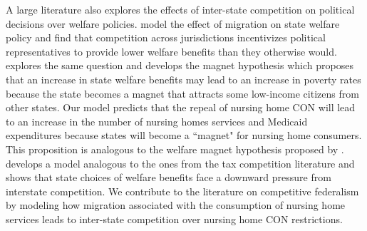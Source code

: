 \documentclass[../Main.tex]{subfiles}
\begin{document}
A large literature also explores the effects of inter-state competition on political decisions over welfare policies. \citet{gramlich1984migration} model the effect of migration on state welfare policy and find that competition across jurisdictions incentivizes political representatives to provide lower welfare benefits than they otherwise would. \citet{peterson1989american} explores the same question and develops the magnet hypothesis which proposes that an increase in state welfare benefits may lead to an increase in poverty rates because the state becomes a magnet that attracts some low-income citizens from other states. Our model predicts that the repeal of nursing home CON will lead to an increase in the number of nursing homes services and Medicaid expenditures because states will become a ``magnet" for nursing home consumers. This proposition is analogous to the welfare magnet hypothesis proposed by \citet{peterson1989american}. \citet{saavedra2000model} develops a model analogous to the ones from the tax competition literature and shows that state choices of welfare benefits face a downward pressure from interstate competition. We contribute to the literature on competitive federalism by modeling how migration associated with the consumption of nursing home services leads to inter-state competition over nursing home CON restrictions. 


\end{document}
